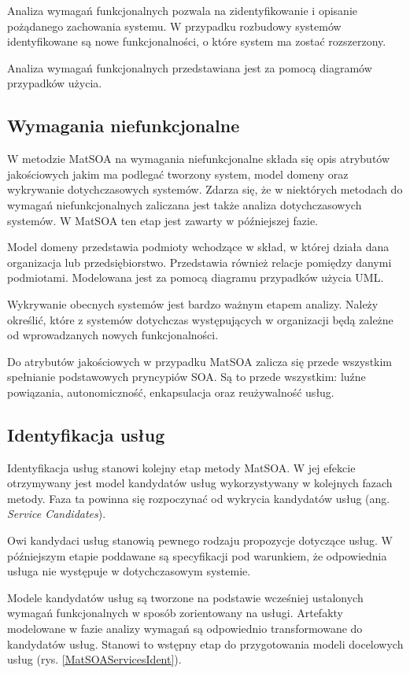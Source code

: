Analiza wymagań funkcjonalnych pozwala na zidentyfikowanie i opisanie pożądanego zachowania systemu. W przypadku rozbudowy systemów identyfikowane są nowe funkcjonalności, o które system ma zostać rozszerzony.

Analiza wymagań funkcjonalnych przedstawiana jest za pomocą diagramów przypadków użycia.

\subsection*{Wymagania niefunkcjonalne}
W metodzie MatSOA na wymagania niefunkcjonalne składa się opis atrybutów jakościowych jakim ma podlegać tworzony system, model domeny oraz wykrywanie dotychczasowych systemów. Zdarza się, że w niektórych metodach do wymagań niefunkcjonalnych zaliczana jest także analiza dotychczasowych systemów. W MatSOA ten etap jest zawarty w późniejszej fazie. 

Model domeny przedstawia podmioty wchodzące w skład, w której działa dana organizacja lub przedsiębiorstwo. Przedstawia również relacje pomiędzy danymi podmiotami. Modelowana jest za pomocą diagramu przypadków użycia UML.

Wykrywanie obecnych systemów jest bardzo ważnym etapem analizy. Należy określić, które z systemów dotychczas występujących w organizacji będą zależne od wprowadzanych nowych funkcjonalności.

Do atrybutów jakościowych w przypadku MatSOA zalicza się przede wszystkim spełnianie podstawowych pryncypiów SOA. Są to przede wszystkim: luźne powiązania, autonomiczność, enkapsulacja oraz reużywalność usług.

\subsection{Identyfikacja usług}
Identyfikacja usług stanowi kolejny etap metody MatSOA. W jej efekcie otrzymywany jest model kandydatów usług wykorzystywany w kolejnych fazach metody. 
Faza ta powinna się rozpoczynać od wykrycia kandydatów usług (ang. \emph{Service Candidates}). 

Owi kandydaci usług stanowią pewnego rodzaju propozycje dotyczące usług.  W późniejszym etapie poddawane są specyfikacji pod warunkiem, że odpowiednia usługa nie występuje w dotychczasowym systemie.

Modele kandydatów usług są tworzone na podstawie wcześniej ustalonych wymagań funkcjonalnych w sposób zorientowany na usługi. Artefakty modelowane w fazie analizy wymagań są odpowiednio transformowane do kandydatów usług. Stanowi to wstępny etap do przygotowania modeli docelowych usług (rys. \ref{MatSOAServicesIdent}). 


